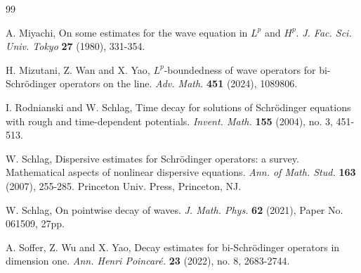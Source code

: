 \documentclass[11pt,reqno]{amsart}
\numberwithin{equation}{section}
\theoremstyle{definition}
\begin{document}
\begin{thebibliography}{99}





 A. Miyachi, On some estimates for the wave equation in $L^p$ and $H^p$.  \textit{J. Fac. Sci. Univ. Tokyo} \textbf{27} (1980), 331-354.

 H. Mizutani, Z. Wan and X. Yao, $L^p$-boundedness of wave operators for bi-Schr\"{o}dinger operators on the line.  \textit{Adv. Math.}	\textbf{451} (2024), 1089806.


 I. Rodnianski and W. Schlag, Time decay for solutions of Schr\"{o}dinger equations with rough and time-dependent potentials. \textit{Invent. Math.} \textbf{155} (2004), no. 3, 451-513.


  W. Schlag, Dispersive estimates for Schr\"{o}dinger operators: a survey. Mathematical aspects of nonlinear dispersive equations. \textit{Ann. of Math. Stud.} \textbf{163} (2007), 255-285.  Princeton Univ. Press, Princeton, NJ.

 W. Schlag, On pointwise decay of waves. \textit{J. Math. Phys.} \textbf{62} (2021), Paper No. 061509, 27pp.


 A. Soffer, Z. Wu and X. Yao, Decay estimates for bi-Schr\"{o}dinger operators in dimension one.  \textit{Ann. Henri Poincar\'{e}.} \textbf{23} (2022),  no. 8, 2683-2744.


\end{thebibliography}
\end{document}
